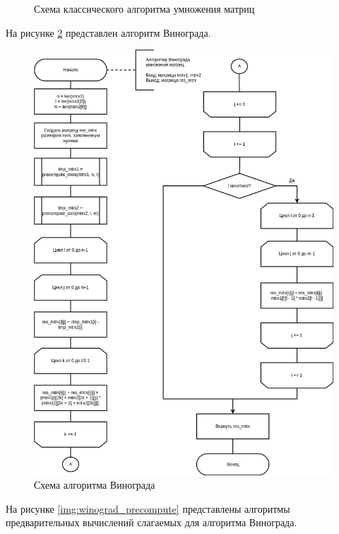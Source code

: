 \begin{figure}[H]
\begin{center}
	\end{center}
	\captionsetup{justification=centering}
	\caption{Схема классического алгоритма умножения матриц}
	\label{img:classic}
\end{figure}

На рисунке \ref{img:winograd} представлен алгоритм Винограда.

\begin{figure}[H]
	\begin{center}
		\includegraphics[scale=0.56]{img/winograd.png}
	\end{center}
	\captionsetup{justification=centering}
	\caption{Схема алгоритма Винограда}
	\label{img:winograd}
\end{figure}

На рисунке \ref{img:winograd_precompute} представлены алгоритмы предварительных вычислений слагаемых для алгоритма Винограда.

